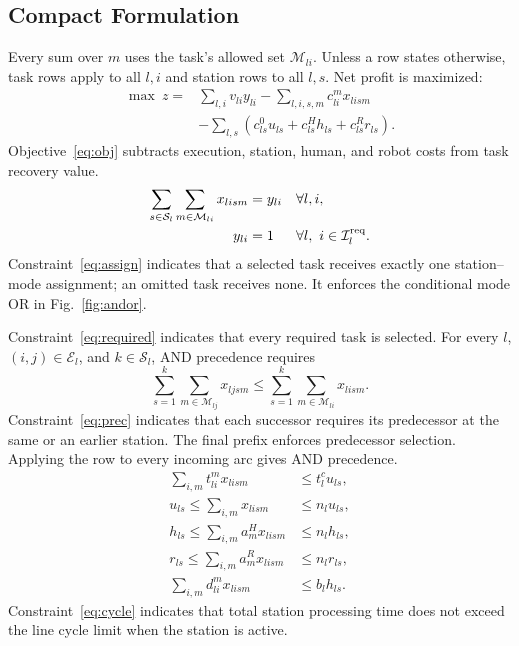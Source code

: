 \subsection{Compact Formulation}
Every sum over $m$ uses the task's allowed set $\mathcal M_{li}$. Unless a row states otherwise, task rows apply to all $l,i$ and station rows to all $l,s$. Net profit is maximized:
\begin{align}
\max\ z={}&\sum_{l,i}v_{li}y_{li}-\sum_{l,i,s,m}c_{li}^{m}x_{lism}\nonumber\\
&-\sum_{l,s}\left(c_{ls}^{0}u_{ls}+c_{ls}^{H}h_{ls}+c_{ls}^{R}r_{ls}\right).\label{eq:obj}
\end{align}
Objective~\eqref{eq:obj} subtracts execution, station, human, and robot costs from task recovery value.
\begin{align}
\sum_{s\in\mathcal S_l}\sum_{m\in\mathcal M_{li}}x_{lism}&=y_{li}&&\forall l,i,\label{eq:assign}\\
y_{li}&=1&&\forall l,\ i\in\mathcal I_l^{\rm req}.\label{eq:required}
\end{align}
Constraint~\eqref{eq:assign} indicates that a selected task receives exactly one station--mode assignment; an omitted task receives none. It enforces the conditional mode OR in Fig.~\ref{fig:andor}.

Constraint~\eqref{eq:required} indicates that every required task is selected.
For every $l$, $(i,j)\in\mathcal E_l$, and $k\in\mathcal S_l$, AND precedence requires
\begin{equation}
\sum_{s=1}^{k}\sum_{m\in\mathcal M_{lj}}x_{ljsm}
\leq\sum_{s=1}^{k}\sum_{m\in\mathcal M_{li}}x_{lism}.\label{eq:prec}
\end{equation}
Constraint~\eqref{eq:prec} indicates that each successor requires its predecessor at the same or an earlier station. The final prefix enforces predecessor selection. Applying the row to every incoming arc gives AND precedence.
\begin{align}
\sum_{i,m}t_{li}^{m}x_{lism}&\leq t_l^c u_{ls},\label{eq:cycle}\\
u_{ls}\leq\sum_{i,m}x_{lism}&\leq n_lu_{ls},\label{eq:active}\\
h_{ls}\leq\sum_{i,m}a_m^Hx_{lism}&\leq n_lh_{ls},\label{eq:hlogic}\\
r_{ls}\leq\sum_{i,m}a_m^Rx_{lism}&\leq n_lr_{ls},\label{eq:rlogic}\\
\sum_{i,m}d_{li}^{m}x_{lism}&\leq b_lh_{ls}.\label{eq:fatigue}
\end{align}
Constraint~\eqref{eq:cycle} indicates that total station processing time does not exceed the line cycle limit when the station is active.

